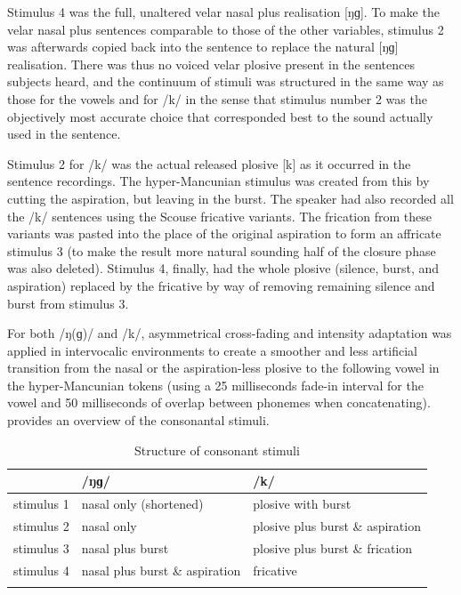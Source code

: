 Stimulus 4 was the full, unaltered velar nasal plus realisation [ŋɡ].
To make the velar nasal plus sentences comparable to those of the other variables, stimulus 2 was afterwards copied back into the sentence to replace the natural [ŋɡ] realisation.
There was thus no voiced velar plosive present in the sentences subjects heard, and the continuum of stimuli was structured in the same way as those for the vowels and for /k/ in the sense that stimulus number 2 was the objectively most accurate choice that corresponded best to the sound actually used in the sentence.

Stimulus 2 for /k/ was the actual released plosive [k] as it occurred in the sentence recordings.
The hyper-Mancunian stimulus was created from this by cutting the aspiration, but leaving in the burst.
The speaker had also recorded all the /k/ sentences using the Scouse fricative variants.
The frication from these variants was pasted into the place of the original aspiration to form an affricate stimulus 3 (to make the result more natural sounding half of the closure phase was also deleted).
Stimulus 4, finally, had the whole plosive (silence, burst, and aspiration) replaced by the fricative by way of removing remaining silence and burst from stimulus 3.

For both /ŋ(ɡ)/ and /k/, asymmetrical cross-fading and intensity adaptation was applied in intervocalic environments to create a smoother and less artificial transition from the nasal or the aspiration-less plosive to the following vowel in the hyper-Mancunian tokens (using a 25 milliseconds fade-in interval for the vowel and 50 milliseconds of overlap between phonemes when concatenating).
 provides an overview of the consonantal stimuli.

\begin{table}
	\caption{Structure of consonant stimuli}
	\label{tab.consonant.stimuli}
	
	\begin{tabular}{lll}
		\lsptoprule
		& /ŋɡ/ & /k/\\
		\midrule
		stimulus 1 & nasal only (shortened) & plosive with burst\\
		stimulus 2 & nasal only & plosive plus burst \& aspiration\\
		stimulus 3 & nasal plus burst & plosive plus burst \& frication\\
		stimulus 4 & nasal plus burst \& aspiration & fricative\\
		\lspbottomrule
	\end{tabular}
\end{table}

